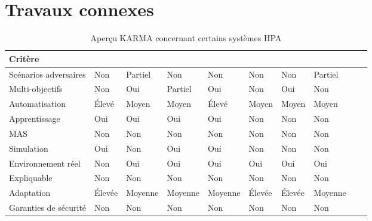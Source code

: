 
\section{Travaux connexes}
\label{sec:travaux_connexes}

\begin{table}[h!]
    \centering
    \caption{Aperçu KARMA concernant certains systèmes HPA}
    \label{tab:autoscaling_criteria}
    {\footnotesize
    \renewcommand{\arraystretch}{1.1}
    \begin{tabular}{>{\raggedright\arraybackslash}m{1.3cm}>{\centering\arraybackslash}m{0.6cm}>{\centering\arraybackslash}m{0.6cm}>{\centering\arraybackslash}m{0.6cm}>{\centering\arraybackslash}m{0.6cm}>{\centering\arraybackslash}m{0.6cm}>{\centering\arraybackslash}m{0.6cm}>{\centering\arraybackslash}m{}>{\centering\arraybackslash}m{}>{\centering\arraybackslash}m{}}
    \hline
    \textbf{Critère} & \vspace{-0.3cm}\textbf{\cite{gymhpa2022}} & \vspace{-0.3cm}\textbf{\cite{aware2023}} & \vspace{-0.3cm}\textbf{\cite{Rossi2019}} & \vspace{-0.3cm}\textbf{\cite{QoSRL}} & \vspace{-0.3cm}\textbf{\cite{Zhou2024}} & \vspace{-0.3cm}\textbf{\cite{KOSMOS}} & \vspace{-0.3cm}\textbf{\cite{COPA}} \\
    \hline
    \hline
    Scénarios adversaires & Non & Partiel & Non & Non & Non & Non & Partiel \\
    \hline
    Multi-objectifs & Non & Oui & Partiel & Oui & Non & Oui & Non \\
    \hline
    Automatisation & Élevé & Moyen & Moyen & Élevé & Moyen & Moyen & Moyen \\
    \hline
    Apprentissage & Oui & Oui & Oui & Oui & Non & Non & Non \\
    \hline
    MAS & Non & Non & Non & Non & Non & Non & Non \\
    \hline
    Simulation & Oui & Non & Oui & Oui & Non & Non & Non \\
    \hline
    Environnement réel & Non & Oui & Oui & Oui & Oui & Oui & Oui \\
    \hline
    Expliquable & Non & Non & Non & Non & Non & Non & Non \\
    \hline
    Adaptation & Élevée & Moyenne & Moyenne & Moyenne & Élevée & Élevée & Moyenne \\
    \hline
    Garanties de sécurité & Non & Non & Non & Non & Non & Non & Non \\
    \hline
    \end{tabular}%
    }
  \end{table}


